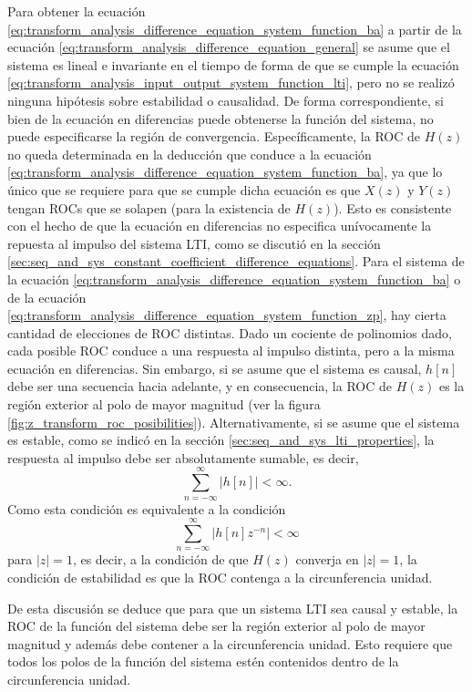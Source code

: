 \documentclass[a4paper]{report}
\begin{document}
Para obtener la ecuación \ref{eq:transform_analysis_difference_equation_system_function_ba} a partir de la ecuación \ref{eq:transform_analysis_difference_equation_general} se asume que el sistema es lineal e invariante en el tiempo de forma de que se cumple la ecuación \ref{eq:transform_analysis_input_output_system_function_lti}, pero no se realizó ninguna hipótesis sobre estabilidad o causalidad. De forma correspondiente, si bien de la ecuación en diferencias puede obtenerse la función del sistema, no puede especificarse la región de convergencia. Específicamente, la ROC de \(H(z)\) no queda determinada en la deducción que conduce a la ecuación \ref{eq:transform_analysis_difference_equation_system_function_ba}, ya que lo único que se requiere para que se cumple dicha ecuación es que \(X(z)\) y \(Y(z)\) tengan ROCs que se solapen (para la existencia de \(H(z)\)). Esto es consistente con el hecho de que la ecuación en diferencias no especifica unívocamente la repuesta al impulso del sistema LTI, como se discutió en la sección \ref{sec:seq_and_sys_constant_coefficient_difference_equations}. Para el sistema de la ecuación \ref{eq:transform_analysis_difference_equation_system_function_ba} o de la ecuación \ref{eq:transform_analysis_difference_equation_system_function_zp}, hay cierta cantidad de elecciones de ROC distintas. Dado un cociente de polinomios dado, cada posible ROC conduce a una respuesta al impulso distinta, pero a la misma ecuación en diferencias. Sin embargo, si se asume que el sistema es causal, \(h[n]\) debe ser una secuencia hacia adelante, y en consecuencia, la ROC de \(H(z)\) es la región exterior al polo de mayor magnitud (ver la figura \ref{fig:z_transform_roc_posibilities}). Alternativamente, si se asume que el sistema es estable, como se indicó en la sección \ref{sec:seq_and_sys_lti_properties}, la respuesta al impulso debe ser absolutamente sumable, es decir,
\[
 \sum_{n=-\infty}^\infty|h[n]|<\infty.
\]
Como esta condición es equivalente a la condición
\[
 \sum_{n=-\infty}^\infty|h[n]z^{-n}|<\infty
\]
para \(|z|=1\), es decir, a la condición de que \(H(z)\) converja en \(|z|=1\), la condición de estabilidad es que la ROC contenga a la circunferencia unidad. 

De esta discusión se deduce que para que un sistema LTI sea causal y estable, la ROC de la función del sistema debe ser la región exterior al polo de mayor magnitud y además debe contener a la circunferencia unidad. Esto requiere que todos los polos de la función del sistema estén contenidos dentro de la circunferencia unidad.
\end{document}
